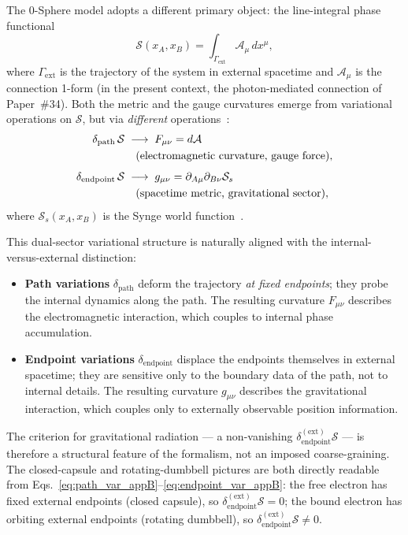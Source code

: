 \documentclass[%
 reprint, amsmath,amssymb, aps, prd, ]{revtex4-2}
\numberwithin{equation}{section}
\begin{document}
The 0-Sphere model adopts a different primary object: the line-integral phase functional
\begin{equation}
\mathcal{S}(x_A, x_B) = \int_{\Gamma_{\mathrm{ext}}} \mathcal{A}_\mu\, dx^\mu,
\label{eq:S_lineintegral}
\end{equation}
where $\Gamma_{\mathrm{ext}}$ is the trajectory of the system in external spacetime and $\mathcal{A}_\mu$ is the connection 1-form (in the present context, the photon-mediated connection of Paper~\#34).
Both the metric and the gauge curvatures emerge from variational operations on $\mathcal{S}$, but via \emph{different} operations~\cite{hanamura51}:
\begin{align}
\delta_{\mathrm{path}}\,\mathcal{S}
&\;\longrightarrow\; F_{\mu\nu} = d\mathcal{A}
\notag\\
&\quad(\text{electromagnetic curvature, gauge force}),
\label{eq:path_var_appB}\\[4pt]
\delta_{\mathrm{endpoint}}\,\mathcal{S}
&\;\longrightarrow\; g_{\mu\nu} = \partial_{A\mu}\partial_{B\nu}\mathcal{S}_s
\notag\\
&\quad(\text{spacetime metric, gravitational sector}),
\label{eq:endpoint_var_appB}
\end{align}
where $\mathcal{S}_s(x_A, x_B)$ is the Synge world function~\cite{hanamura51, hanamura52}.

This dual-sector variational structure is naturally aligned with the internal-versus-external distinction:
\begin{itemize}[leftmargin=2em, itemsep=4pt]
\item \textbf{Path variations} $\delta_{\mathrm{path}}$ deform the trajectory \emph{at fixed endpoints}; they probe the internal dynamics along the path. The resulting curvature $F_{\mu\nu}$ describes the electromagnetic interaction, which couples to internal phase accumulation.
\item \textbf{Endpoint variations} $\delta_{\mathrm{endpoint}}$ displace the endpoints themselves in external spacetime; they are sensitive only to the boundary data of the path, not to internal details. The resulting curvature $g_{\mu\nu}$ describes the gravitational interaction, which couples only to externally observable position information.
\end{itemize}

The criterion for gravitational radiation --- a non-vanishing $\delta_{\mathrm{endpoint}}^{(\mathrm{ext})}\mathcal{S}$ --- is therefore a structural feature of the formalism, not an imposed coarse-graining.
The closed-capsule and rotating-dumbbell pictures are both directly readable from Eqs.~\eqref{eq:path_var_appB}--\eqref{eq:endpoint_var_appB}:
the free electron has fixed external endpoints (closed capsule), so $\delta_{\mathrm{endpoint}}^{(\mathrm{ext})}\mathcal{S} = 0$;
the bound electron has orbiting external endpoints (rotating dumbbell), so $\delta_{\mathrm{endpoint}}^{(\mathrm{ext})}\mathcal{S} \neq 0$.
\end{document}
